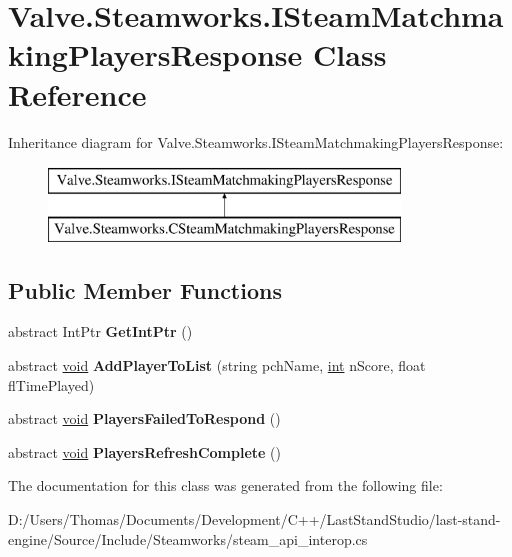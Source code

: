 \hypertarget{classValve_1_1Steamworks_1_1ISteamMatchmakingPlayersResponse}{}\section{Valve.\+Steamworks.\+I\+Steam\+Matchmaking\+Players\+Response Class Reference}
\label{classValve_1_1Steamworks_1_1ISteamMatchmakingPlayersResponse}
Inheritance diagram for Valve.\+Steamworks.\+I\+Steam\+Matchmaking\+Players\+Response\+:\begin{figure}[H]
\begin{center}
\leavevmode
\includegraphics[height=2.000000cm]{classValve_1_1Steamworks_1_1ISteamMatchmakingPlayersResponse}
\end{center}
\end{figure}
\subsection*{Public Member Functions}
\begin{DoxyCompactItemize}
\item 
\hypertarget{classValve_1_1Steamworks_1_1ISteamMatchmakingPlayersResponse_aa29845c7a687f3603f659a81af390b6d}{}abstract Int\+Ptr {\bfseries Get\+Int\+Ptr} ()\label{classValve_1_1Steamworks_1_1ISteamMatchmakingPlayersResponse_aa29845c7a687f3603f659a81af390b6d}

\item 
\hypertarget{classValve_1_1Steamworks_1_1ISteamMatchmakingPlayersResponse_a3e67bda2e749340baa6dc118a3b689bc}{}abstract \hyperlink{SDL__audio_8h_a52835ae37c4bb905b903cbaf5d04b05f}{void} {\bfseries Add\+Player\+To\+List} (string pch\+Name, \hyperlink{SDL__thread_8h_a6a64f9be4433e4de6e2f2f548cf3c08e}{int} n\+Score, float fl\+Time\+Played)\label{classValve_1_1Steamworks_1_1ISteamMatchmakingPlayersResponse_a3e67bda2e749340baa6dc118a3b689bc}

\item 
\hypertarget{classValve_1_1Steamworks_1_1ISteamMatchmakingPlayersResponse_add19cd1ade81c93b1e2574cfd6617daf}{}abstract \hyperlink{SDL__audio_8h_a52835ae37c4bb905b903cbaf5d04b05f}{void} {\bfseries Players\+Failed\+To\+Respond} ()\label{classValve_1_1Steamworks_1_1ISteamMatchmakingPlayersResponse_add19cd1ade81c93b1e2574cfd6617daf}

\item 
\hypertarget{classValve_1_1Steamworks_1_1ISteamMatchmakingPlayersResponse_afcb8cc9746e9ca474a9b3db561788b9d}{}abstract \hyperlink{SDL__audio_8h_a52835ae37c4bb905b903cbaf5d04b05f}{void} {\bfseries Players\+Refresh\+Complete} ()\label{classValve_1_1Steamworks_1_1ISteamMatchmakingPlayersResponse_afcb8cc9746e9ca474a9b3db561788b9d}

\end{DoxyCompactItemize}


The documentation for this class was generated from the following file\+:\begin{DoxyCompactItemize}
\item 
D\+:/\+Users/\+Thomas/\+Documents/\+Development/\+C++/\+Last\+Stand\+Studio/last-\/stand-\/engine/\+Source/\+Include/\+Steamworks/steam\+\_\+api\+\_\+interop.\+cs\end{DoxyCompactItemize}
